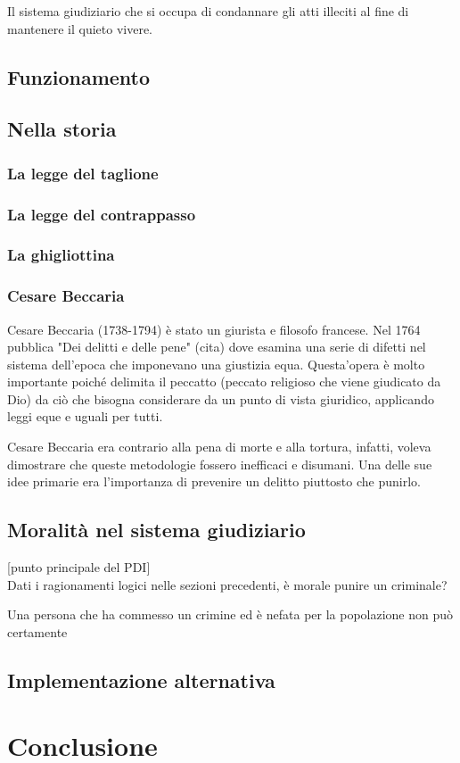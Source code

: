 \documentclass[a4paper, 12pt]{article}
\begin{document}
Il sistema giudiziario che si occupa di condannare gli atti illeciti
al fine di mantenere il quieto vivere.

\subsection{Funzionamento}

\subsection{Nella storia}

\subsubsection{La legge del taglione}


\subsubsection{La legge del contrappasso}
\subsubsection{La ghigliottina}
\subsubsection{Cesare Beccaria}

Cesare Beccaria (1738-1794) è stato un giurista e filosofo francese.
Nel 1764 pubblica "Dei delitti e delle pene" (cita) 
dove esamina una serie di difetti nel sistema dell'epoca che imponevano una giustizia equa.
Questa'opera è molto importante poiché delimita il peccatto (peccato religioso
che viene giudicato da Dio) da ciò che bisogna considerare da un punto di vista giuridico,
applicando leggi eque e uguali per tutti.

Cesare Beccaria era contrario alla pena di morte e alla tortura, infatti,
voleva dimostrare che queste metodologie fossero inefficaci e disumani.
Una delle sue idee primarie era l'importanza di prevenire un delitto piuttosto che punirlo.

\subsection{Moralità nel sistema giudiziario}

[punto principale del PDI] \\
Dati i ragionamenti logici nelle sezioni precedenti, è morale punire
un criminale?

Una persona che ha commesso un crimine ed è nefata
per la popolazione non può certamente

\subsection{Implementazione alternativa}

\section{Conclusione}

\pagebreak

\listoffigures

\pagebreak


\printbibliography[heading=subbibliography]
\end{document}
